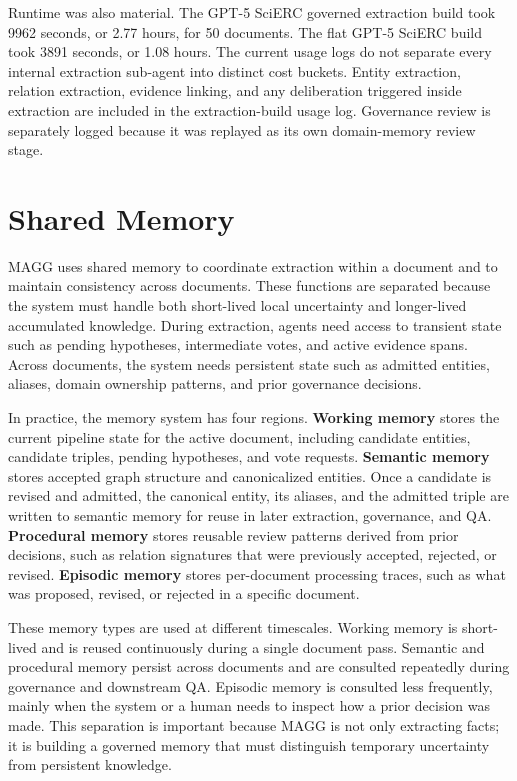 \documentclass{article}
\newcommand{\system}{\textsc{MAGG}}
\begin{document}
Runtime was also material. The GPT-5 SciERC governed extraction build took 9962 seconds, or 2.77 hours, for 50 documents. The flat GPT-5 SciERC build took 3891 seconds, or 1.08 hours. The current usage logs do not separate every internal extraction sub-agent into distinct cost buckets. Entity extraction, relation extraction, evidence linking, and any deliberation triggered inside extraction are included in the extraction-build usage log. Governance review is separately logged because it was replayed as its own domain-memory review stage.

\section{Shared Memory}
\label{app:shared_memory}
\system{} uses shared memory to coordinate extraction within a document and to maintain consistency across documents. These functions are separated because the system must handle both short-lived local uncertainty and longer-lived accumulated knowledge. During extraction, agents need access to transient state such as pending hypotheses, intermediate votes, and active evidence spans. Across documents, the system needs persistent state such as admitted entities, aliases, domain ownership patterns, and prior governance decisions.

In practice, the memory system has four regions. \textbf{Working memory} stores the current pipeline state for the active document, including candidate entities, candidate triples, pending hypotheses, and vote requests. \textbf{Semantic memory} stores accepted graph structure and canonicalized entities. Once a candidate is revised and admitted, the canonical entity, its aliases, and the admitted triple are written to semantic memory for reuse in later extraction, governance, and QA. \textbf{Procedural memory} stores reusable review patterns derived from prior decisions, such as relation signatures that were previously accepted, rejected, or revised. \textbf{Episodic memory} stores per-document processing traces, such as what was proposed, revised, or rejected in a specific document.

These memory types are used at different timescales. Working memory is short-lived and is reused continuously during a single document pass. Semantic and procedural memory persist across documents and are consulted repeatedly during governance and downstream QA. Episodic memory is consulted less frequently, mainly when the system or a human needs to inspect how a prior decision was made. This separation is important because \system{} is not only extracting facts; it is building a governed memory that must distinguish temporary uncertainty from persistent knowledge.
\end{document}

